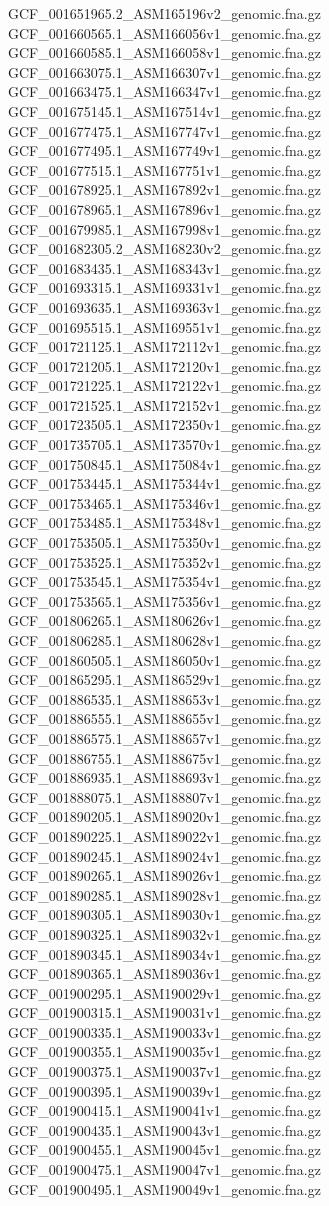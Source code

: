 \documentclass[12pt, letterpaper]{article}
\begin{document}
\begin{verbatim*}
GCF_001651965.2_ASM165196v2_genomic.fna.gz
GCF_001660565.1_ASM166056v1_genomic.fna.gz
GCF_001660585.1_ASM166058v1_genomic.fna.gz
GCF_001663075.1_ASM166307v1_genomic.fna.gz
GCF_001663475.1_ASM166347v1_genomic.fna.gz
GCF_001675145.1_ASM167514v1_genomic.fna.gz
GCF_001677475.1_ASM167747v1_genomic.fna.gz
GCF_001677495.1_ASM167749v1_genomic.fna.gz
GCF_001677515.1_ASM167751v1_genomic.fna.gz
GCF_001678925.1_ASM167892v1_genomic.fna.gz
GCF_001678965.1_ASM167896v1_genomic.fna.gz
GCF_001679985.1_ASM167998v1_genomic.fna.gz
GCF_001682305.2_ASM168230v2_genomic.fna.gz
GCF_001683435.1_ASM168343v1_genomic.fna.gz
GCF_001693315.1_ASM169331v1_genomic.fna.gz
GCF_001693635.1_ASM169363v1_genomic.fna.gz
GCF_001695515.1_ASM169551v1_genomic.fna.gz
GCF_001721125.1_ASM172112v1_genomic.fna.gz
GCF_001721205.1_ASM172120v1_genomic.fna.gz
GCF_001721225.1_ASM172122v1_genomic.fna.gz
GCF_001721525.1_ASM172152v1_genomic.fna.gz
GCF_001723505.1_ASM172350v1_genomic.fna.gz
GCF_001735705.1_ASM173570v1_genomic.fna.gz
GCF_001750845.1_ASM175084v1_genomic.fna.gz
GCF_001753445.1_ASM175344v1_genomic.fna.gz
GCF_001753465.1_ASM175346v1_genomic.fna.gz
GCF_001753485.1_ASM175348v1_genomic.fna.gz
GCF_001753505.1_ASM175350v1_genomic.fna.gz
GCF_001753525.1_ASM175352v1_genomic.fna.gz
GCF_001753545.1_ASM175354v1_genomic.fna.gz
GCF_001753565.1_ASM175356v1_genomic.fna.gz
GCF_001806265.1_ASM180626v1_genomic.fna.gz
GCF_001806285.1_ASM180628v1_genomic.fna.gz
GCF_001860505.1_ASM186050v1_genomic.fna.gz
GCF_001865295.1_ASM186529v1_genomic.fna.gz
GCF_001886535.1_ASM188653v1_genomic.fna.gz
GCF_001886555.1_ASM188655v1_genomic.fna.gz
GCF_001886575.1_ASM188657v1_genomic.fna.gz
GCF_001886755.1_ASM188675v1_genomic.fna.gz
GCF_001886935.1_ASM188693v1_genomic.fna.gz
GCF_001888075.1_ASM188807v1_genomic.fna.gz
GCF_001890205.1_ASM189020v1_genomic.fna.gz
GCF_001890225.1_ASM189022v1_genomic.fna.gz
GCF_001890245.1_ASM189024v1_genomic.fna.gz
GCF_001890265.1_ASM189026v1_genomic.fna.gz
GCF_001890285.1_ASM189028v1_genomic.fna.gz
GCF_001890305.1_ASM189030v1_genomic.fna.gz
GCF_001890325.1_ASM189032v1_genomic.fna.gz
GCF_001890345.1_ASM189034v1_genomic.fna.gz
GCF_001890365.1_ASM189036v1_genomic.fna.gz
GCF_001900295.1_ASM190029v1_genomic.fna.gz
GCF_001900315.1_ASM190031v1_genomic.fna.gz
GCF_001900335.1_ASM190033v1_genomic.fna.gz
GCF_001900355.1_ASM190035v1_genomic.fna.gz
GCF_001900375.1_ASM190037v1_genomic.fna.gz
GCF_001900395.1_ASM190039v1_genomic.fna.gz
GCF_001900415.1_ASM190041v1_genomic.fna.gz
GCF_001900435.1_ASM190043v1_genomic.fna.gz
GCF_001900455.1_ASM190045v1_genomic.fna.gz
GCF_001900475.1_ASM190047v1_genomic.fna.gz
GCF_001900495.1_ASM190049v1_genomic.fna.gz

\end{verbatim*}
\end{document}
